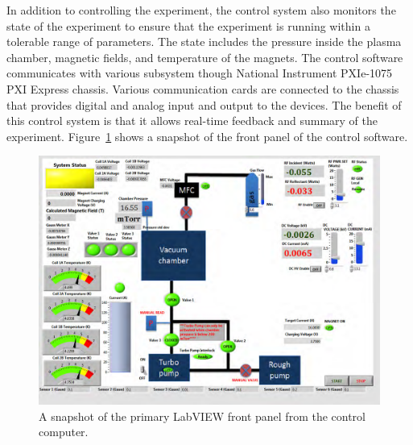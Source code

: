 In addition to controlling the experiment, the control system also monitors the state of the experiment to ensure that the experiment is running within a tolerable range of parameters. The state includes the pressure inside the plasma chamber, magnetic fields, and temperature of the magnets. The control software communicates with various subsystem though National Instrument PXIe-1075 PXI Express chassis. Various communication cards are connected to the chassis that provides digital and analog input and output to the devices. The benefit of this control system is that it allows real-time feedback and summary of the experiment. Figure~\ref{mdpx-labview} shows a snapshot of the front panel of the control software.

\begin{figure}[h!]
\begin{center}
\includegraphics[width=6in]{figures/mdpx_labview.png}
\caption{A snapshot of the primary LabVIEW front panel from the control computer.\label{mdpx-labview}}
\end{center}
\end{figure}



